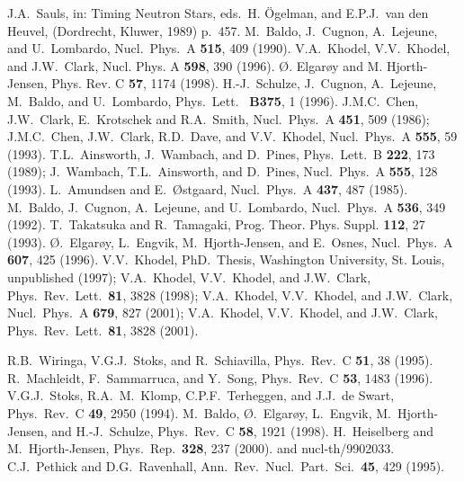 \begin{thebibliography}{99}
J.A.\ Sauls, in: Timing Neutron Stars, 
eds.\ H. \"{O}gelman, and E.P.J.\ van den Heuvel,   
(Dordrecht, Kluwer, 1989) p.\ 457. 
  M.\ Baldo, J.\ Cugnon, A.\ Lejeune, and U.\ Lombardo,
  Nucl.\ Phys.\ A {\bf 515}, 409 (1990).
  V.A.\ Khodel, V.V.\ Khodel, and J.W.\ Clark,
  Nucl. Phys. A {\bf 598}, 390 (1996).
  \O. Elgar\o y and M. Hjorth-Jensen,
  Phys. Rev.  C {\bf 57}, 1174 (1998). 
  H.-J.\ Schulze, J.\ Cugnon, A.\ Lejeune, M.\ Baldo, 
  and U.\ Lombardo, 
  Phys.\ Lett.\  { \bf B375}, 1 (1996). 
  J.M.C.\ Chen, J.W.\ Clark, E.\ Krotschek and R.A.\ Smith,
  Nucl.\ Phys.\ A {\bf 451}, 509 (1986);
  J.M.C.\ Chen, J.W.\ Clark, R.D.\ Dave, and V.V.\ Khodel,
  Nucl.\ Phys.\ A {\bf 555}, 59 (1993).
  T.L.\ Ainsworth, J.\ Wambach, and D.\ Pines,
  Phys.\ Lett.\ B {\bf 222}, 173 (1989);
  J.\ Wambach, T.L.\ Ainsworth, and D.\ Pines,
  Nucl.\ Phys.\ A {\bf 555}, 128 (1993).
  L.\ Amundsen and E.\ \O stgaard, 
  Nucl.\ Phys.\ A {\bf 437}, 487 (1985).
  M.\ Baldo, J.\ Cugnon, A.\ Lejeune, and U.\ Lombardo,
  Nucl.\ Phys.\ A {\bf 536}, 349 (1992).
  T.\ Takatsuka and R.\ Tamagaki,
  Prog. Theor. Phys. Suppl. {\bf 112}, 27 (1993).
  \O.\ Elgar\o y, L.\ Engvik, M.\ Hjorth-Jensen, and E.\ Osnes,
  Nucl.\ Phys.\ A {\bf 607}, 425 (1996).
  V.V.\ Khodel, PhD.\ Thesis, Washington University, St. Louis, 
  unpublished (1997); 
  V.A.\ Khodel, V.V.\ Khodel, and J.W.\ Clark, 
  Phys.\ Rev.\ Lett.\ {\bf 81}, 3828 (1998); 
  V.A.\ Khodel, V.V.\ Khodel, and J.W.\ Clark, 
  Nucl.\ Phys.\ A {\bf  679}, 827 (2001);
  V.A.\ Khodel, V.V.\ Khodel, and J.W.\ Clark, 
  Phys.\ Rev.\ Lett.\ {\bf 81}, 3828 (2001).


 R.B.\ Wiringa, V.G.J.\ Stoks, and R.\ Schiavilla, 
Phys.\ Rev.\ C {\bf 51}, 38 (1995).
     R.\ Machleidt, F.\ Sammarruca, and Y.\ Song,
                     Phys.\ Rev.\ C {\bf 53}, 1483  (1996).
 V.G.J.\ Stoks, R.A.\ M.\ Klomp, C.P.F.\ Terheggen, 
and J.J.\
de Swart, Phys.\ Rev.\ C {\bf 49}, 2950  (1994).
 M.\ Baldo, \O.\ Elgar\o y, L.\ Engvik, 
                  M.\ Hjorth-Jensen, and H.-J.\ Schulze,
                  Phys.\ Rev.\ C {\bf 58}, 1921 (1998).
 H.\ Heiselberg and M.\ Hjorth-Jensen, Phys.\ Rep.\ {\bf 328},
237 (2000).
                 and nucl-th/9902033.
 C.J.\ Pethick and D.G.\ Ravenhall, 
Ann.\ Rev.\ Nucl.\ Part.\ Sci.\ {\bf 45}, 429 (1995).


\end{thebibliography}
